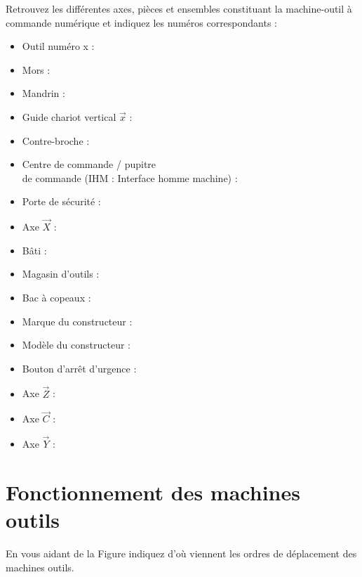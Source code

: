 \documentclass[12pt]{article}
\newcounter{exo}
\newenvironment{exo}{\stepcounter{exo}\vspace{0.5cm}{\bfseries Question \theexo\ :}}{\par\vspace{0.5cm}}
\begin{document}
\begin{exo}\label{exo1} Retrouvez les différentes axes, pièces et ensembles constituant la machine-outil à commande numérique et indiquez les numéros correspondants :\\ \end{exo}
\begin{minipage}{.55\linewidth}
\begin{itemize}
    \item Outil numéro x :
    \item Mors :
    \item Mandrin :
    \item Guide chariot vertical $\overrightarrow{x}$ :
    \item Contre-broche :
    \item Centre de commande / pupitre\\ de commande (IHM : Interface homme machine) :
    \item Porte de sécurité :
    \item Axe $\overrightarrow{X}$ :
    \item Bâti :
\end{itemize}


\end{minipage}
\begin{minipage}{.44\linewidth}
\begin{itemize}
    \item Magasin d’outils :
    \item Bac à copeaux :
    \item Marque du constructeur :
    \item Modèle du constructeur :
    \item Bouton d'arrêt d’urgence :
    \item Axe $\overrightarrow{Z}$ :
    \item Axe $\overrightarrow{C}$ :
    \item Axe $\overrightarrow{Y}$ :
\end{itemize}
\end{minipage}

\section{Fonctionnement des machines outils}
\begin{exo}\label{exo1} En vous aidant de la Figure indiquez d'où viennent les ordres de déplacement des machines outils.\end{exo}
\end{document}
